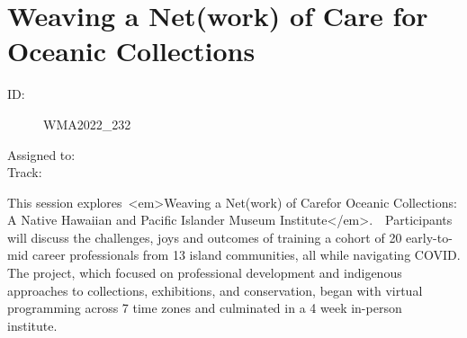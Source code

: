 \documentclass{report}
\begin{document}
              

              
        
          \newpage
          \section{ Weaving a Net(work) of Care for Oceanic Collections }
            \begin{description}
              \item [ID:]
              WMA2022\_232

              \item [Assigned to:]
                \item [Track:]
              \end{description}

              This session explores <em>Weaving a Net(work) of Carefor Oceanic Collections: A Native Hawaiian and Pacific Islander Museum Institute</em>.  Participants will discuss the challenges, joys and outcomes of training a cohort of 20 early-to-mid career professionals from 13 island communities, all while navigating COVID. The project, which focused on professional development and indigenous approaches to collections, exhibitions, and conservation, began with virtual programming across 7 time zones and culminated in a 4 week in-person institute.  
\end{document}
